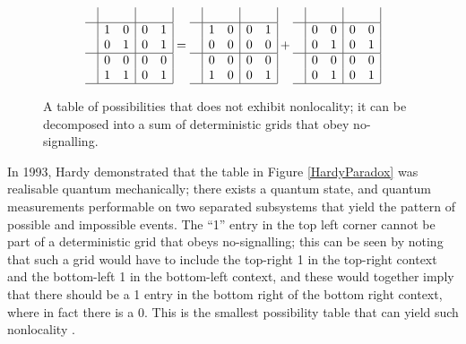 \documentclass[reprint]{revtex4-1}
\theoremstyle{definition}
\begin{document}
\begin{figure}
\begin{equation*}
\begin{array}{c| c c | c c |}
&&&&\\ \hline
&1 &0  &0 & 1\\
&0&1  &0 &1\\ \hline
&0&0&0&0 \\
&1&1 &0 &1 \\ \hline
\end{array} =
\begin{array}{c| c c | c c |}
&&&&\\ \hline
&1 &0  &0 & 1\\
&0&0  &0 &0\\ \hline
&0&0&0&0 \\
&1&0 &0 &1 \\ \hline
\end{array} +
\begin{array}{c| c c | c c |}
&&&&\\ \hline
&0 &0  &0 & 0\\
&0&1  &0 &1\\ \hline
&0&0&0&0 \\
&0&1 &0 &1 \\ \hline
\end{array} 
\end{equation*}
\caption{A table of possibilities that does not exhibit nonlocality; it can be decomposed into a sum of deterministic grids that obey no-signalling.}
\label{localtable}
\end{figure}

In 1993, Hardy \cite{Hard1993} demonstrated that the table in Figure \ref{HardyParadox} was realisable quantum mechanically; there exists a quantum state, and quantum measurements performable on two separated subsystems that yield the pattern of possible and impossible events. The ``1'' entry in the top left corner cannot be part of a deterministic grid that obeys no-signalling; this can be seen by noting that such a grid would have to include the top-right 1 in the top-right context and the bottom-left 1 in the bottom-left context, and these would together imply that there should be a 1 entry in the bottom right of the bottom right context, where in fact there is a 0. This is the smallest possibility table that can yield such nonlocality \cite{Mans2011}.
\end{document}
